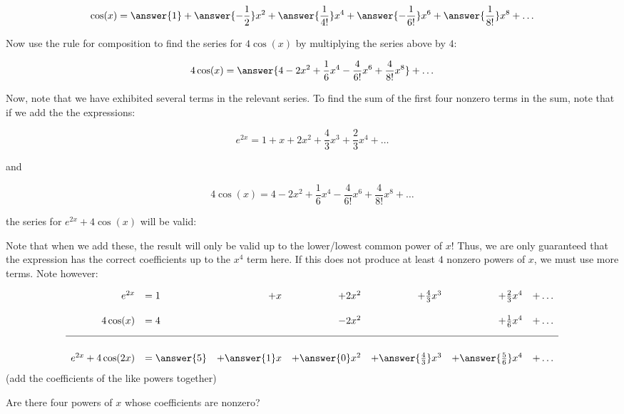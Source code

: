 \documentclass{ximera}
\begin{document}
\begin{exercise}
\begin{exercise}
\begin{exercise}
\[
\cos(x)= \answer{1}+\answer{-\frac{1}{2}}x^2+\answer{\frac{1}{4!}}x^4+\answer{-\frac{1}{6!}}x^6+\answer{\frac{1}{8!}}x^8 + \ldots
\]

\begin{exercise}
Now use the rule for composition to find the series for $4 \cos(x)$ by multiplying the series above by $4$:

\[
4 \cos(x) = \answer{4-2x^2+\frac{1}{6}x^4- \frac{4}{6!} x^6 +\frac{4}{8!}x^8}+ \ldots
\]

\end{exercise}
\end{exercise}
Now, note that we have exhibited several terms in the relevant series.  To find the sum of the first four nonzero terms in the sum, note that if we add the the expressions:

\[e^{2x} = 1+x+2x^2+\frac{4}{3}x^3+\frac{2}{3}x^4+ \ldots\]

and

\[ 4 \cos(x) = 4-2x^2+\frac{1}{6}x^4- \frac{4}{6!} x^6 +\frac{4}{8!}x^8+ \ldots \]

the series for $e^{2x}+4 \cos(x)$ will be valid:

\begin{multipleChoice}
\end{multipleChoice}

Note that when we add these, the result will only be valid up to the lower/lowest common power of $x$!  Thus, we are only guaranteed that the expression has the correct coefficients up to the $x^4$ term here.  If this does not produce at least $4$ nonzero powers of $x$, we must use more terms.  Note however:

\[ 
\begin{array}{rlrrrrr}
e^{2x} &= 1&+x&+2x^2&+\frac{4}{3}x^3&+\frac{2}{3}x^4&+ \ldots \\ [3ex]
4 \cos(x) &= 4& &-2x^2& &+\frac{1}{6}x^4& + \ldots \\[2ex]
\hline \\ [1ex]
e^{2x}+4\cos(2x) & = \answer{5}&+\answer{1}x&+\answer{0}x^2&+\answer{\frac{4}{3}}x^3&+\answer{\frac{5}{6}}x^4& +\ldots
\end{array}
\]
(add the coefficients of the like powers together)

Are there four powers of $x$ whose coefficients are nonzero?

\begin{multipleChoice}
\end{multipleChoice}


\end{exercise}
\end{exercise}
\end{document}
